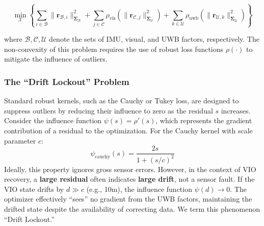 \documentclass[conference]{IEEEtran}
\begin{document}
\begin{equation}
\min_{\mathcal{X}} \left\{ \sum_{i \in \mathcal{B}} \| \mathbf{r}_{\mathcal{B},i} \|^2_{\boldsymbol{\Sigma}_{\mathcal{B}}} + \sum_{j \in \mathcal{C}} \rho_{\text{vis}}( \| \mathbf{r}_{\mathcal{C},j} \|^2_{\boldsymbol{\Sigma}_{\mathcal{C}}} ) + \sum_{k \in \mathcal{U}} \rho_{\text{uwb}}( \| \mathbf{r}_{\mathcal{U},k} \|^2_{\boldsymbol{\Sigma}_{\mathcal{U}}} ) \right\}
\end{equation}

where $\mathcal{B}, \mathcal{C}, \mathcal{U}$ denote the sets of IMU, visual, and UWB factors, respectively. The non-convexity of this problem requires the use of robust loss functions $\rho(\cdot)$ to mitigate the influence of outliers.

\subsubsection{The ``Drift Lockout'' Problem}
Standard robust kernels, such as the Cauchy or Tukey loss, are designed to suppress outliers by reducing their influence to zero as the residual $s$ increases. Consider the influence function $\psi(s) = \rho'(s)$, which represents the gradient contribution of a residual to the optimization. For the Cauchy kernel with scale parameter $c$:
\begin{equation}
\psi_{\text{cauchy}}(s) = \frac{2s}{1 + (s/c)^2}
\end{equation}
Ideally, this property ignores gross sensor errors. However, in the context of VIO recovery, a \textbf{large residual} often indicates \textbf{large drift}, not a sensor fault. If the VIO state drifts by $d \gg c$ (e.g., 10m), the influence function $\psi(d) \to 0$. The optimizer effectively ``sees'' no gradient from the UWB factors, maintaining the drifted state despite the availability of correcting data. We term this phenomenon ``Drift Lockout.''
\end{document}
